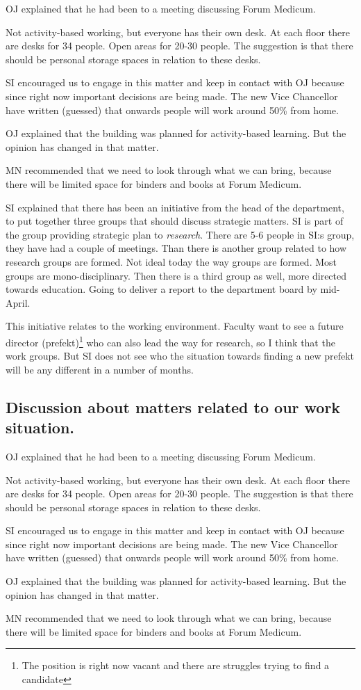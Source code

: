 \documentclass[
]{article}
\begin{document}
OJ explained that he had been to a meeting discussing Forum Medicum.

Not activity-based working, but everyone has their own desk. At each
floor there are desks for 34 people. Open areas for 20-30 people. The
suggestion is that there should be personal storage spaces in relation
to these desks.

SI encouraged us to engage in this matter and keep in contact with OJ
because since right now important decisions are being made. The new Vice
Chancellor have written (guessed) that onwards people will work around
50\% from home.

OJ explained that the building was planned for activity-based learning.
But the opinion has changed in that matter.

MN recommended that we need to look through what we can bring, because
there will be limited space for binders and books at Forum Medicum.

SI explained that there has been an initiative from the head of the
department, to put together three groups that should discuss strategic
matters. SI is part of the group providing strategic plan to
\emph{research}. There are 5-6 people in SI:s group, they have had a
couple of meetings. Than there is another group related to how research
groups are formed. Not ideal today the way groups are formed. Most
groups are mono-disciplinary. Then there is a third group as well, more
directed towards education. Going to deliver a report to the department
board by mid-April.

This initiative relates to the working environment. Faculty want to see
a future director (prefekt)\footnote{The position is right now vacant
  and there are struggles trying to find a candidate} who can also lead
the way for research, so I think that the work groups. But SI does not
see who the situation towards finding a new prefekt will be any
different in a number of months.

\hypertarget{discussion-about-matters-related-to-our-work-situation.}{%
\subsection{Discussion about matters related to our work
situation.}\label{discussion-about-matters-related-to-our-work-situation.}}

OJ explained that he had been to a meeting discussing Forum Medicum.

Not activity-based working, but everyone has their own desk. At each
floor there are desks for 34 people. Open areas for 20-30 people. The
suggestion is that there should be personal storage spaces in relation
to these desks.

SI encouraged us to engage in this matter and keep in contact with OJ
because since right now important decisions are being made. The new Vice
Chancellor have written (guessed) that onwards people will work around
50\% from home.

OJ explained that the building was planned for activity-based learning.
But the opinion has changed in that matter.

MN recommended that we need to look through what we can bring, because
there will be limited space for binders and books at Forum Medicum.
\end{document}
